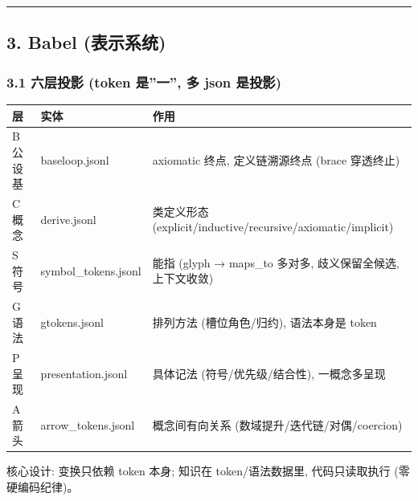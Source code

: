 \documentclass[
]{article}
\begin{document}
\begin{center}\rule{0.5\linewidth}{0.5pt}\end{center}

\subsection{3. Babel (表示系统)}\label{babel-ux8868ux793aux7cfbux7edf}

\subsubsection{3.1 六层投影 (token 是''一'', 多 json
是投影)}\label{ux516dux5c42ux6295ux5f71-token-ux662fux4e00-ux591a-json-ux662fux6295ux5f71}

\begin{longtable}[]{@{}
  >{\raggedright\arraybackslash}p{}
  >{\raggedright\arraybackslash}p{}
  >{\raggedright\arraybackslash}p{}@{}}
\toprule\noalign{}
\begin{minipage}[b]{\linewidth}\raggedright
层
\end{minipage} & \begin{minipage}[b]{\linewidth}\raggedright
实体
\end{minipage} & \begin{minipage}[b]{\linewidth}\raggedright
作用
\end{minipage} \\
\midrule\noalign{}
\endhead
\bottomrule\noalign{}
\endlastfoot
B 公设基 & baseloop.jsonl & axiomatic 终点, 定义链溯源终点 (brace
穿透终止) \\
C 概念 & derive.jsonl & 5 类定义形态
(explicit/inductive/recursive/axiomatic/implicit) \\
S 符号 & symbol\_tokens.jsonl & 能指 (glyph → maps\_to 多对多,
歧义保留全候选, 上下文收敛) \\
G 语法 & gtokens.jsonl & 排列方法 (槽位角色/归约), 语法本身是 token \\
P 呈现 & presentation.jsonl & 具体记法 (符号/优先级/结合性),
一概念多呈现 \\
A 箭头 & arrow\_tokens.jsonl & 概念间有向关系
(数域提升/迭代链/对偶/coercion) \\
\end{longtable}

核心设计: 变换只依赖 token 本身; 知识在 token/语法数据里, 代码只读取执行
(零硬编码纪律)。
\end{document}
